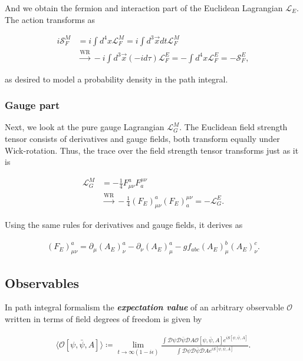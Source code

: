 \documentclass{article}
\theoremstyle{plain} %
\theoremstyle{convention} %
\theoremstyle{remark} %
\def\df#1{\textbf{\textit{#1}}}
\numberwithin{equation}{section}
\begin{document}
And we obtain the fermion and interaction part of the Euclidean Lagrangian $\mathcal{L}_E$. The action transforms as

\begin{align*}
    i \mathcal{S}_{F}^M &= i \int d^4x \mathcal{L}_{F}^M = i \int d^3\vec{x} dt \mathcal{L}_{F}^M \\
    &\stackrel{\text{WR}}{\longrightarrow} - i \int d^3\vec{x} (-i d\tau) \mathcal{L}_{F}^E = - \int d^4x \mathcal{L}_{F}^E = - \mathcal{S}_{F}^E,
\end{align*}

as desired to model a probability density in the path integral.

\subsubsection{Gauge part}

Next, we look at the pure gauge Lagrangian $\mathcal{L}_{G}^M$. The Euclidean field strength tensor consists of derivatives and gauge fields, both transform equally under Wick-rotation. Thus, the trace over the field strength tensor transforms just as it is

\begin{align*}
    \mathcal{L}_G^M &= - \frac{1}{4} F_{\mu \nu}^a F_a^{\mu \nu} \\
    &\stackrel{\text{WR}}{\longrightarrow} - \frac{1}{4} (F_E)_{\mu \nu}^a (F_E)_a^{\mu \nu} = - \mathcal{L}_G^E.
\end{align*}

Using the same rules for derivatives and gauge fields, it derives as

\begin{align*}
    (F_E)_{\mu \nu}^a = \partial_{\mu} (A_E)_{\nu}^a - \partial_{\nu} (A_E)_{\mu}^a - g f_{abc} (A_E)_{\mu}^b (A_E)_{\nu}^c.
\end{align*}

\subsection{Observables}

In path integral formalism the \df{expectation value} of an arbitrary observable $\mathcal{O}$ written in terms of field degrees of freedom is given by

\begin{align}
    \langle \mathcal{O}[\psi, \bar{\psi}, A] \rangle \coloneqq \lim_{t \to \infty(1-i \epsilon)} \frac{ \int \mathcal{D}\psi \mathcal{D} \bar{\psi} \mathcal{D} A \mathcal{O}[\psi, \bar{\psi}, A] e^{iS[\psi, \bar{\psi}, A]} }{ \int \mathcal{D}\psi \mathcal{D} \bar{\psi} \mathcal{D} A e^{iS[\psi, \bar{\psi}, A]} }. \label{eq:expectation_value}
\end{align}
\end{document}
